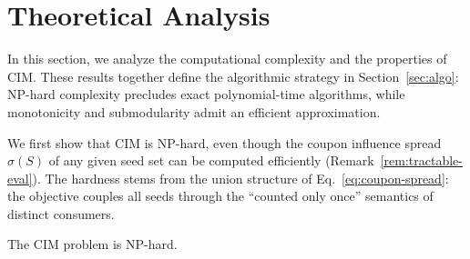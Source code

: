 \documentclass[sigconf]{acmart}
\begin{document}
\section{Theoretical Analysis}
\label{sec:theory}

In this section, we analyze the computational complexity and the
properties of CIM.
These results together define the algorithmic strategy in
Section~\ref{sec:algo}: NP-hard complexity precludes exact polynomial-time
algorithms, while monotonicity and submodularity admit an efficient
approximation.

We first show that CIM is NP-hard, even though the coupon influence
spread $\sigma(S)$ of any given seed set can be computed efficiently
(Remark~\ref{rem:tractable-eval}).
The hardness stems from the union structure of
Eq.~\eqref{eq:coupon-spread}: the objective couples all seeds through
the ``counted only once'' semantics of distinct consumers.

\begin{theorem}
\label{thm:nphard}
The CIM problem is NP-hard.
\end{theorem}
\end{document}
